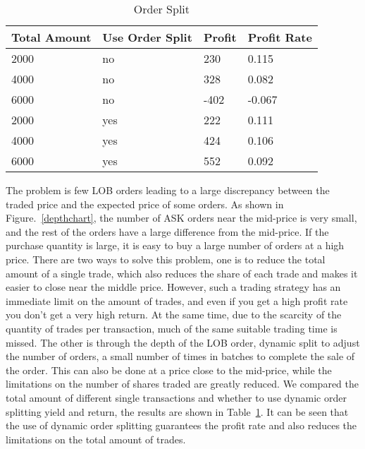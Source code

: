 \documentclass[conference]{IEEEtran}
\begin{document}
\begin{table}[tb]
\caption{Order Split}
\begin{center}
\begin{tabular}{|p{}|p{}|p{}|p{}|}
\hline
\textbf{Total Amount} & \textbf{Use Order Split} & \textbf{Profit} & \textbf{Profit Rate}\\
\hline
2000 & no &  230& 0.115\\
\hline
4000 & no &  328& 0.082\\
\hline
6000 & no &  -402&  -0.067\\
\hline
2000 & yes &  222& 0.111\\
\hline
4000 & yes &  424& 0.106\\
\hline
6000 & yes &  552&  0.092\\
\hline
\end{tabular}
\label{lobdepth}
\end{center}
\end{table}

The problem is few LOB orders leading to a large discrepancy between the traded price and the expected price of some orders. As shown in Figure.~\ref{depthchart}, the number of ASK orders near the mid-price is very small, and the rest of the orders have a large difference from the mid-price. If the purchase quantity is large, it is easy to buy a large number of orders at a high price. There are two ways to solve this problem, one is to reduce the total amount of a single trade, which also reduces the share of each trade and makes it easier to close near the middle price. However, such a trading strategy has an immediate limit on the amount of trades, and even if you get a high profit rate you don't get a very high return. At the same time, due to the scarcity of the quantity of trades per transaction, much of the same suitable trading time is missed. The other is through the depth of the LOB order, dynamic split to adjust the number of orders, a small number of times in batches to complete the sale of the order. This can also be done at a price close to the mid-price, while the limitations on the number of shares traded are greatly reduced. We compared the total amount of different single transactions and whether to use dynamic order splitting yield and return, the results are shown in Table~\ref{lobdepth}. It can be seen that the use of dynamic order splitting guarantees the profit rate and also reduces the limitations on the total amount of trades.
\end{document}
